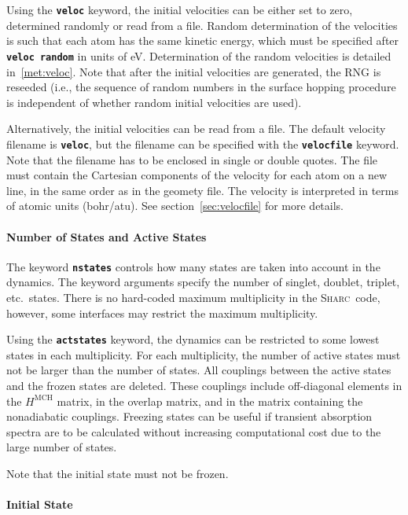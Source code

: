 \documentclass[a4paper,10pt,DIV=15,openany]{scrbook}
\newcommand{\sharc}{\textsc{Sharc}}
\newcommand{\ttt}[1]{\textbf{\texttt{#1}}}
\begin{document}
Using the \ttt{veloc} keyword, the initial velocities can be either set to zero, determined randomly or read from a file. Random determination of the velocities is such that each atom has the same kinetic energy, which must be specified after \ttt{veloc random} in units of eV. Determination of the random velocities is detailed in~\ref{met:veloc}. Note that after the initial velocities are generated, the RNG is reseeded (i.e., the sequence of random numbers in the surface hopping procedure is independent of whether random initial velocities are used).

Alternatively, the initial velocities can be read from a file. 
The default velocity filename is \ttt{veloc}, but the filename can be specified with the \ttt{velocfile} keyword. Note that the filename has to be enclosed in single or double quotes. The file must contain the Cartesian components of the velocity for each atom on a new line, in the same order as in the geomety file. The velocity is interpreted in terms of atomic units (bohr/atu). See section~\ref{sec:velocfile} for more details.

\paragraph{Number of States and Active States}

The keyword \ttt{nstates} controls how many states are taken into account in the dynamics. The keyword arguments specify the number of singlet, doublet, triplet, etc.\ states. There is no hard-coded maximum multiplicity in the \sharc\ code, however, some interfaces may restrict the maximum multiplicity. 

Using the \ttt{actstates} keyword, the dynamics can be restricted to some lowest states in each multiplicity. For each multiplicity, the number of active states must not be larger than the number of states. All couplings between the active states and the frozen states are deleted. These couplings include off-diagonal elements in the $H^{\text{MCH}}$ matrix, in the overlap matrix, and in the matrix containing the nonadiabatic couplings. Freezing states can be useful if transient absorption spectra are to be calculated without increasing computational cost due to the large number of states.

Note that the initial state must not be frozen.

\paragraph{Initial State}
\end{document}
